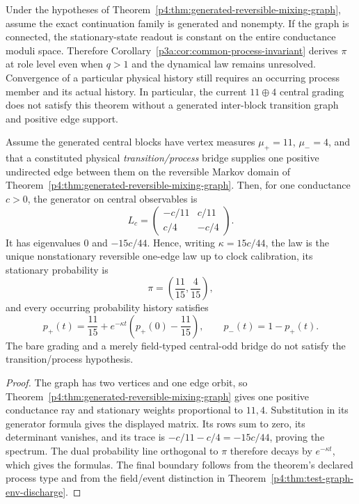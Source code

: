 \documentclass[12pt,a4paper]{article}
\begin{document}
\begin{corollary}
\label{p4:cor:reversible-family-common-stationary-state}
Under the hypotheses of
Theorem~\ref{p4:thm:generated-reversible-mixing-graph}, assume the exact
continuation family is generated and nonempty.  If the graph is connected,
the stationary-state readout is constant on the entire conductance moduli
space.  Therefore
Corollary~\ref{p3a:cor:common-process-invariant} derives \(\pi\) at role level
even when \(q>1\) and the dynamical law remains unresolved.  Convergence of a
particular physical history still requires an occurring process member and
its actual history.  In particular, the current \(11\oplus4\) central grading
does not satisfy this theorem without a generated inter-block transition
graph and positive edge support.
\end{corollary}

\begin{corollary}
\label{p4:cor:eleven-four-one-edge-relaxation}
Assume the generated central blocks have vertex measures
\(\mu_+=11\), \(\mu_-=4\), and that a constituted physical
\emph{transition/process} bridge supplies one positive undirected edge between
them on the reversible Markov domain of
Theorem~\ref{p4:thm:generated-reversible-mixing-graph}.  Then, for one
conductance \(c>0\), the generator on central observables is
\[
 L_c=
 \begin{pmatrix}
  -c/11 & c/11\\
  c/4 & -c/4
 \end{pmatrix}.
\]
It has eigenvalues \(0\) and \(-15c/44\).  Hence, writing
\(\kappa=15c/44\), the law is the unique nonstationary reversible one-edge
law up to clock calibration, its stationary probability is
\[
 \boxed{\pi=\left(\frac{11}{15},\frac4{15}\right),}
\]
and every occurring probability history satisfies
\[
 p_+(t)=\frac{11}{15}
  +e^{-\kappa t}\left(p_+(0)-\frac{11}{15}\right),
 \qquad
 p_-(t)=1-p_+(t).
\]
The bare grading and a merely field-typed central-odd bridge do not satisfy
the transition/process hypothesis.
\end{corollary}

\begin{proof}
The graph has two vertices and one edge orbit, so
Theorem~\ref{p4:thm:generated-reversible-mixing-graph} gives one positive
conductance ray and stationary weights proportional to \(11,4\).  Substitution
in its generator formula gives the displayed matrix.  Its rows sum to zero,
its determinant vanishes, and its trace is \(-c/11-c/4=-15c/44\), proving the
spectrum.  The dual probability line orthogonal to \(\pi\) therefore decays
by \(e^{-\kappa t}\), which gives the formulas.  The final boundary follows
from the theorem's declared process type and from the field/event distinction
in Theorem~\ref{p4:thm:test-graph-env-discharge}.
\end{proof}
\end{document}

